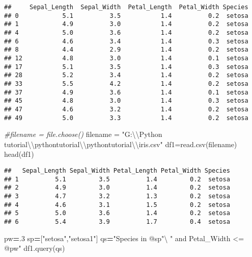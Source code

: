 \documentclass[
]{article}
\newenvironment{Shaded}{\begin{snugshade}}{\end{snugshade}}
\newcommand{\CommentTok}[1]{\textcolor[rgb]{0.56,0.35,0.01}{\textit{#1}}}
\newcommand{\FloatTok}[1]{\textcolor[rgb]{0.00,0.00,0.81}{#1}}
\newcommand{\FunctionTok}[1]{\textcolor[rgb]{0.00,0.00,0.00}{#1}}
\newcommand{\NormalTok}[1]{#1}
\newcommand{\OperatorTok}[1]{\textcolor[rgb]{0.81,0.36,0.00}{\textbf{#1}}}
\newcommand{\OtherTok}[1]{\textcolor[rgb]{0.56,0.35,0.01}{#1}}
\newcommand{\SpecialCharTok}[1]{\textcolor[rgb]{0.00,0.00,0.00}{#1}}
\newcommand{\StringTok}[1]{\textcolor[rgb]{0.31,0.60,0.02}{#1}}
\begin{document}
\begin{verbatim}
##     Sepal_Length  Sepal_Width  Petal_Length  Petal_Width Species
## 0            5.1          3.5           1.4          0.2  setosa
## 1            4.9          3.0           1.4          0.2  setosa
## 4            5.0          3.6           1.4          0.2  setosa
## 6            4.6          3.4           1.4          0.3  setosa
## 8            4.4          2.9           1.4          0.2  setosa
## 12           4.8          3.0           1.4          0.1  setosa
## 17           5.1          3.5           1.4          0.3  setosa
## 28           5.2          3.4           1.4          0.2  setosa
## 33           5.5          4.2           1.4          0.2  setosa
## 37           4.9          3.6           1.4          0.1  setosa
## 45           4.8          3.0           1.4          0.3  setosa
## 47           4.6          3.2           1.4          0.2  setosa
## 49           5.0          3.3           1.4          0.2  setosa
\end{verbatim}

\begin{Shaded}
\begin{Highlighting}[]
\CommentTok{\#filename = file.choose()}
\NormalTok{filename }\OtherTok{=} \StringTok{"G:}\SpecialCharTok{\textbackslash{}\textbackslash{}}\StringTok{Python tutorial}\SpecialCharTok{\textbackslash{}\textbackslash{}}\StringTok{pythontutorial}\SpecialCharTok{\textbackslash{}\textbackslash{}}\StringTok{pythontutorial}\SpecialCharTok{\textbackslash{}\textbackslash{}}\StringTok{iris.csv"}
\NormalTok{df1}\OtherTok{=}\FunctionTok{read.csv}\NormalTok{(filename)}
\FunctionTok{head}\NormalTok{(df1)}
\end{Highlighting}
\end{Shaded}

\begin{verbatim}
##   Sepal_Length Sepal_Width Petal_Length Petal_Width Species
## 1          5.1         3.5          1.4         0.2  setosa
## 2          4.9         3.0          1.4         0.2  setosa
## 3          4.7         3.2          1.3         0.2  setosa
## 4          4.6         3.1          1.5         0.2  setosa
## 5          5.0         3.6          1.4         0.2  setosa
## 6          5.4         3.9          1.7         0.4  setosa
\end{verbatim}

\begin{Shaded}
\begin{Highlighting}[]
\NormalTok{pw}\OperatorTok{=}\FloatTok{.3}
\NormalTok{sp}\OperatorTok{=}\NormalTok{[}\StringTok{"setosa"}\NormalTok{,}\StringTok{"setosa1"}\NormalTok{]}
\NormalTok{qs}\OperatorTok{=}\StringTok{"Species in @sp"}\NormalTok{\textbackslash{}}
 \StringTok{" and Petal\_Width \textless{}= @pw"}
\NormalTok{df1.query(qs)}
\end{Highlighting}
\end{Shaded}
\end{document}
